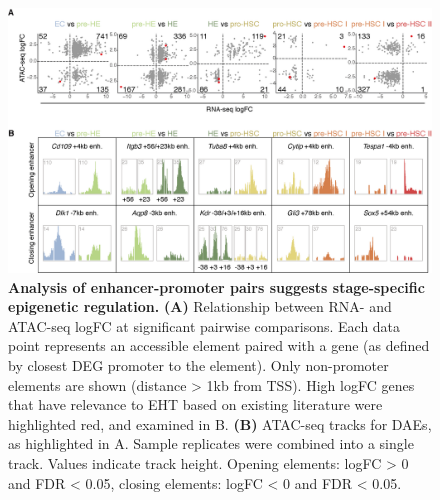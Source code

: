 \begin{figure}[t]
    \centering
    \includegraphics[width=\textwidth,height=\textheight,keepaspectratio]{figures/chapter3/ch3_stage-enhs.png}
    \caption[{Analysis of enhancer-promoter pairs suggests stage-specific epigenetic regulation.}]
    {\textbf{Analysis of enhancer-promoter pairs suggests stage-specific epigenetic regulation.} 
    \textbf{(A)} Relationship between RNA- and ATAC-seq logFC at significant pairwise comparisons. Each data point represents an accessible element paired with a gene (as defined by closest DEG promoter to the element). Only non-promoter elements are shown (distance > 1kb from TSS). High logFC genes that have relevance to EHT based on existing literature were highlighted red, and examined in B.  
    \textbf{(B)} ATAC-seq tracks for DAEs, as highlighted in A. Sample replicates were combined into a single track. Values indicate track height. Opening elements: logFC > 0 and FDR < 0.05, closing elements: logFC < 0 and FDR < 0.05. 
    }
    \label{fig:ch3_stage-enhs}
\end{figure}



